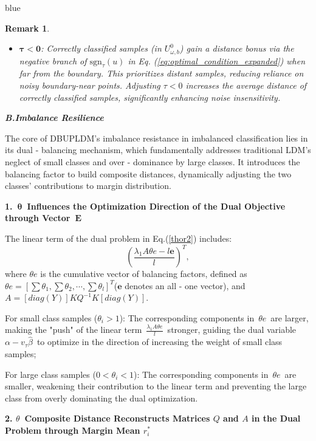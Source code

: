 \documentclass[a4paper]{cas-sc}
\newtheorem{remark}{Remark}
\begin{document}
\begin{color}{blue}
\begin{remark}
\begin{itemize}
    \item \(\boldsymbol{\tau < 0}\):  
    Correctly classified samples (in \(U_{\omega,b}^{0}\)) gain a \emph{distance bonus} via the negative branch of \(\text{sgn}_\tau(u)\) in Eq. (\ref{eq:optimal_condition_expanded}) when far from the boundary. This prioritizes distant samples, reducing reliance on noisy boundary-near points. Adjusting \(\tau < 0\) increases the average distance of correctly classified samples, significantly enhancing noise insensitivity.  
\end{itemize}
\end{remark}


\textbf{\textit{B.Imbalance Resilience}}

The core of DBUPLDM’s imbalance resistance in imbalanced classification lies in its dual - balancing mechanism, which fundamentally addresses traditional LDM’s neglect of small classes and over - dominance by large classes. It introduces the balancing factor to build composite distances, dynamically adjusting the two classes’ contributions to margin distribution.

\textbf{1. \(\boldsymbol{\theta}\) Influences the Optimization Direction of the Dual Objective through Vector \(\boldsymbol{E}\)}

The linear term of the dual problem in Eq.(\ref{thor2}) includes:
\begin{equation}
\left( \frac{\lambda_1 A \theta e - l \boldsymbol{e}}{l} \right)^T,
\label{eq:dual_linear_term}
\end{equation}
where \(\theta e\) is the cumulative vector of balancing factors, defined as \(\theta e = \left[ \sum \theta_1, \sum \theta_2, \cdots, \sum \theta_l \right]^T\)(\(\boldsymbol{e}\) denotes an all - one vector), and $A=[diag(Y)] K Q^{-1} K [diag(Y)]$.

For small class samples (\(\theta_i > 1\)): The corresponding components in \(\theta e\) are larger, making the "push" of the linear term \(\frac{\lambda_1 A \theta e}{l}\) stronger, guiding the dual variable \(\alpha - v_\tau \hat{\beta}\) to optimize in the direction of increasing the weight of small class samples;

For large class samples (\(0 < \theta_i < 1\)): The corresponding components in \(\theta e\) are smaller, weakening their contribution to the linear term and preventing the large class from overly dominating the dual optimization.

\textbf{2. \(\theta\) Composite Distance Reconstructs Matrices $Q$ and $A$ in the Dual Problem through 
Margin Mean $r_i^*$}


\end{color}
\end{document}
